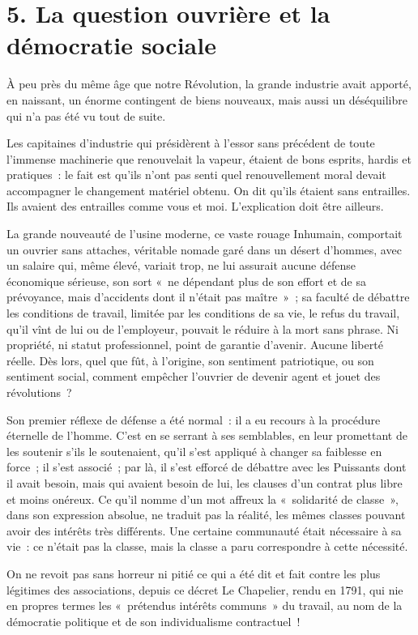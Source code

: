 \documentclass[french,twoside]{book} %
\begin{document}
\section[5. La question ouvrière et la démocratie sociale]{5. La question ouvrière et la démocratie sociale}
\noindent À peu près du même âge que notre Révolution, la grande industrie avait apporté, en naissant, un énorme contingent de biens nouveaux, mais aussi un déséquilibre qui n’a pas été vu tout de suite.\par
Les capitaines d’industrie qui présidèrent à l’essor sans précédent de toute l’immense machinerie que renouvelait la vapeur, étaient de bons esprits, hardis et pratiques : le fait est qu’ils n’ont pas senti quel renouvellement moral devait accompagner le changement matériel obtenu. On dit qu’ils étaient sans entrailles. Ils avaient des entrailles comme vous et moi. L’explication doit être ailleurs.\par
La grande nouveauté de l’usine moderne, ce vaste rouage Inhumain, comportait un ouvrier sans attaches, véritable nomade garé dans un désert d’hommes, avec un salaire qui, même élevé, variait trop, ne lui assurait aucune défense économique sérieuse, son sort « ne dépendant plus de son effort et de sa prévoyance, mais d’accidents dont il n’était pas maître » ; sa faculté de débattre les conditions de travail, limitée par les conditions de sa vie, le refus du travail, qu’il vînt de lui ou de l’employeur, pouvait le réduire à la mort sans phrase. Ni propriété, ni statut professionnel, point de garantie d’avenir. Aucune liberté réelle. Dès lors, quel que fût, à l’origine, son sentiment patriotique, ou son sentiment social, comment empêcher l’ouvrier de devenir agent et jouet des révolutions ?\par
Son premier réflexe de défense a été normal : il a eu recours à la procédure éternelle de l’homme. C’est en se serrant à ses semblables, en leur promettant de les soutenir s’ils le soutenaient, qu’il s’est appliqué à changer sa faiblesse en force ; il s’est associé ; par là, il s’est efforcé de débattre avec les Puissants dont il avait besoin, mais qui avaient besoin de lui, les clauses d’un contrat plus libre et moins onéreux. Ce qu’il nomme d’un mot affreux la « solidarité de classe », dans son expression absolue, ne traduit pas la réalité, les mêmes classes pouvant avoir des intérêts très différents. Une certaine communauté était nécessaire à sa vie : ce n’était pas la classe, mais la classe a paru correspondre à cette nécessité.\par
On ne revoit pas sans horreur ni pitié ce qui a été dit et fait contre les plus légitimes des associations, depuis ce décret Le Chapelier, rendu en 1791, qui nie en propres termes les « prétendus intérêts communs » du travail, au nom de la démocratie politique et de son individualisme contractuel !\par
\end{document}
